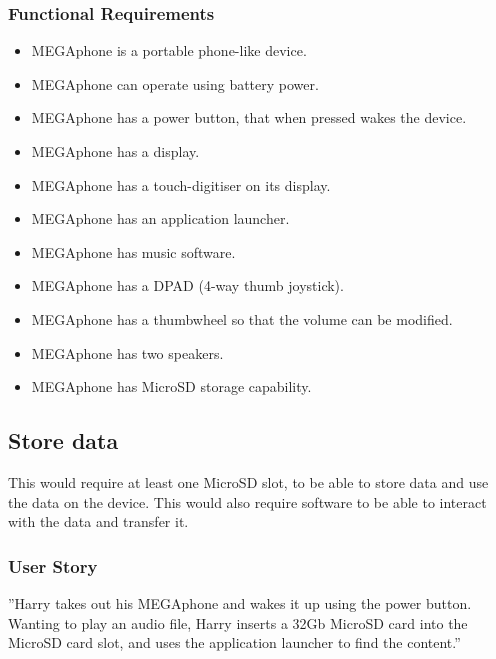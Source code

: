         \subsubsection{Functional Requirements}
        \begin{itemize}
        \item MEGAphone is a portable phone-like device.
        \item MEGAphone can operate using battery power.
        \item MEGAphone has a power button, that when pressed wakes the device.
        \item MEGAphone has a display.
        \item MEGAphone has a touch-digitiser on its display.
        \item MEGAphone has an application launcher.
        \item MEGAphone has music software.
        \item MEGAphone has a DPAD (4-way thumb joystick).
	\item MEGAphone has a thumbwheel so that the volume can be modified.
	\item MEGAphone has two speakers.
	\item MEGAphone has MicroSD storage capability.
        \end{itemize}

\subsection{Store data}
	This would require at least one MicroSD slot, to be able to store data and use the data on the device. This would also require software to be able to interact with the data and transfer it.\\

	\subsubsection{User Story}
	''Harry takes out his MEGAphone and wakes it up using the power button. Wanting to play an audio file, Harry inserts a 32Gb MicroSD card into the MicroSD card slot, and uses the application launcher to find the content.''

